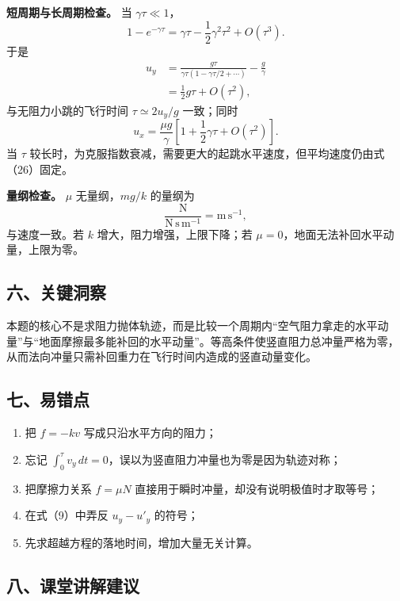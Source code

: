 \documentclass[12pt,a4paper,UTF8]{ctexart}
\newcommand{\tightlist}{\setlength{\itemsep}{0pt}\setlength{\parskip}{0pt}}
\begin{document}
\textbf{短周期与长周期检查。} 当 \(\gamma\tau\ll1\)， \[
1-e^{-\gamma\tau}
=\gamma\tau-\frac12\gamma^2\tau^2+O(\tau^3).
\] 于是 \[
\begin{aligned}
u_y
&=\frac{g\tau}{\gamma\tau(1-\gamma\tau/2+\cdots)}
-\frac g\gamma\\
&=\frac12g\tau+O(\tau^2),
\end{aligned} \tag{27}
\] 与无阻力小跳的飞行时间 \(\tau\simeq2u_y/g\) 一致；同时 \[
u_x=\frac{\mu g}{\gamma}
\left[1+\frac12\gamma\tau+O(\tau^2)\right].
\] 当 \(\tau\)
较长时，为克服指数衰减，需要更大的起跳水平速度，但平均速度仍由式（26）固定。

\textbf{量纲检查。} \(\mu\) 无量纲，\(mg/k\) 的量纲为 \[
\frac{\mathrm N}{\mathrm{N\,s\,m^{-1}}}
=\mathrm{m\,s^{-1}},
\] 与速度一致。若 \(k\) 增大，阻力增强，上限下降；若
\(\mu=0\)，地面无法补回水平动量，上限为零。

\subsection{六、关键洞察}\label{ux516dux5173ux952eux6d1eux5bdf}

本题的核心不是求阻力抛体轨迹，而是比较一个周期内``空气阻力拿走的水平动量''与``地面摩擦最多能补回的水平动量''。等高条件使竖直阻力总冲量严格为零，从而法向冲量只需补回重力在飞行时间内造成的竖直动量变化。

\subsection{七、易错点}\label{ux4e03ux6613ux9519ux70b9}

\begin{enumerate}
\def\labelenumi{\arabic{enumi}.}
\tightlist
\item
  把 \(f=-kv\) 写成只沿水平方向的阻力；
\item
  忘记
  \(\int_0^\tau v_y\,dt=0\)，误以为竖直阻力冲量也为零是因为轨迹对称；
\item
  把摩擦力关系 \(f=\mu N\) 直接用于瞬时冲量，却没有说明极值时才取等号；
\item
  在式（9）中弄反 \(u_y-u'_y\) 的符号；
\item
  先求超越方程的落地时间，增加大量无关计算。
\end{enumerate}

\subsection{八、课堂讲解建议}\label{ux516bux8bfeux5802ux8bb2ux89e3ux5efaux8bae}
\end{document}
